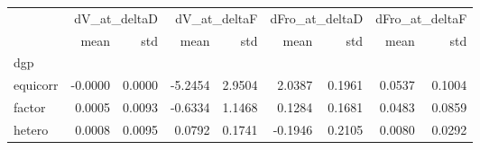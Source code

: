 \begin{tabular}{lrrrrrrrr}
\toprule
 & \multicolumn{2}{r}{dV_at_deltaD} & \multicolumn{2}{r}{dV_at_deltaF} & \multicolumn{2}{r}{dFro_at_deltaD} & \multicolumn{2}{r}{dFro_at_deltaF} \\
 & mean & std & mean & std & mean & std & mean & std \\
dgp &  &  &  &  &  &  &  &  \\
\midrule
equicorr & -0.0000 & 0.0000 & -5.2454 & 2.9504 & 2.0387 & 0.1961 & 0.0537 & 0.1004 \\
factor & 0.0005 & 0.0093 & -0.6334 & 1.1468 & 0.1284 & 0.1681 & 0.0483 & 0.0859 \\
hetero & 0.0008 & 0.0095 & 0.0792 & 0.1741 & -0.1946 & 0.2105 & 0.0080 & 0.0292 \\
\bottomrule
\end{tabular}
